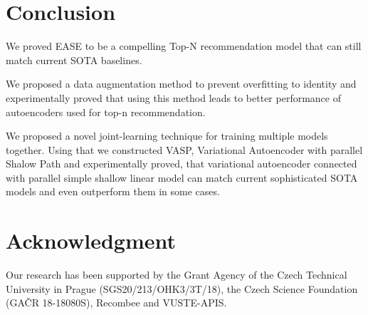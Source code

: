 \documentclass[conference]{IEEEtran}
\begin{document}
\section{Conclusion}
    
    We proved EASE to be a compelling Top-N recommendation model that can still match current SOTA baselines.
    
    We proposed a data augmentation method to prevent overfitting to identity and experimentally proved that using this method leads to better performance of autoencoders used for top-n recommendation.
    
    We proposed a novel joint-learning technique for training multiple models together. Using that we constructed VASP, Variational Autoencoder with parallel Shalow Path and experimentally proved, that variational autoencoder connected with parallel simple shallow linear model can match current sophisticated SOTA models and even outperform them in some cases.

\section*{Acknowledgment}
Our research has been supported by the Grant Agency of the Czech Technical University in Prague (SGS20/213/OHK3/3T/18), the Czech Science Foundation (GA\v{C}R 18-18080S), Recombee and VUSTE-APIS.




 
 
\end{document}
